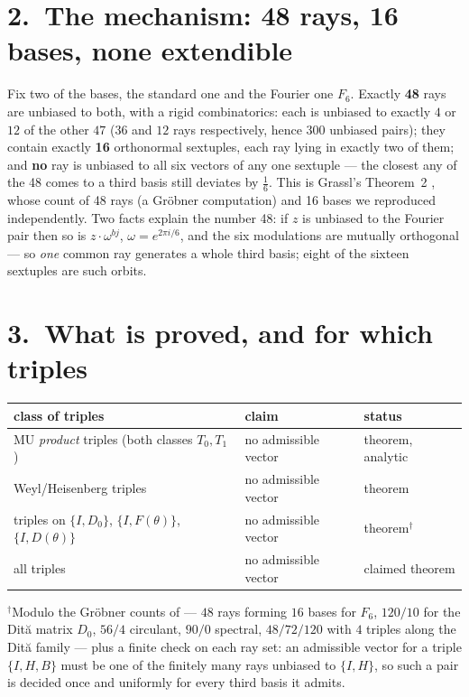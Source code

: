 \documentclass[10pt]{article}
\begin{document}
\section*{2.\ The mechanism: 48 rays, 16 bases, none extendible}

Fix two of the bases, the standard one and the Fourier one $F_6$. Exactly \textbf{48} rays are unbiased
to both, with a rigid combinatorics: each is unbiased to exactly $4$ or $12$ of the
other $47$ ($36$ and $12$ rays respectively, hence $300$ unbiased pairs); they contain exactly
\textbf{16} orthonormal sextuples, each ray lying in exactly two of them; and \textbf{no} ray is
unbiased to all six vectors of any one sextuple --- the closest any of the 48 comes to a third basis
still deviates by $\tfrac16$. This is Grassl's Theorem~2 \cite{Grassl04}, whose count of 48 rays (a
Gr\"obner computation) and 16 bases we reproduced independently. Two facts explain the number 48: if
$z$ is unbiased to the Fourier pair then so is $z\cdot\omega^{bj}$, $\omega=e^{2\pi i/6}$, and the six
modulations are mutually orthogonal --- so \emph{one} common ray generates a whole third basis; eight of
the sixteen sextuples are such orbits.

\section*{3.\ What is proved, and for which triples}

\begin{center}
\small
\begin{tabular}{@{}p{}p{}p{}@{}}
\toprule
class of triples & claim & status \\
\midrule
MU \emph{product} triples (both classes $T_0,T_1$) & no admissible vector & theorem, analytic \cite{MW12}\\
Weyl/Heisenberg triples & no admissible vector & theorem \cite{Grassl04}\\
triples on $\{I,D_0\}$, $\{I,F(\theta)\}$, $\{I,D(\theta)\}$ & no admissible vector & theorem$^{\dagger}$ \cite{BW09}\\
all triples & no admissible vector & claimed theorem \cite{CWT26,Sun26}\\
\bottomrule
\end{tabular}
\end{center}

$^{\dagger}$Modulo the Gr\"obner counts of \cite{BW09} --- $48$ rays forming $16$ bases for $F_6$,
$120/10$ for the Dit\u{a} matrix $D_0$, $56/4$ circulant, $90/0$ spectral, $48/72/120$ with $4$ triples
along the Dit\u{a} family --- plus a finite check on each ray set: an admissible vector for a triple
$\{I,H,B\}$ must be one of the finitely many rays unbiased to $\{I,H\}$, so such a pair is decided once
and uniformly for every third basis it admits.
\end{document}
